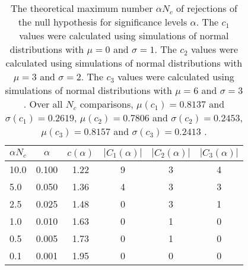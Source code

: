 \begin{table}[h!]
\begin{center}
\begin{tabular}{| l | c | c | c | c | c |}\hline
$\alpha N_c$ & $\alpha$ & $c(\alpha)$ & $|C_1(\alpha)|$ & $|C_2(\alpha)|$ & $|C_3(\alpha)|$ \\\hline
10.0 & 0.100 & 1.22 & 9 & 3 & 4 \\\hline
5.0 & 0.050 & 1.36 & 4 & 3 & 3 \\\hline
2.5 & 0.025 & 1.48 & 0 & 3 & 1 \\\hline
1.0 & 0.010 & 1.63 & 0 & 1 & 0 \\\hline
0.5 & 0.005 & 1.73 & 0 & 1 & 0 \\\hline
0.1 & 0.001 & 1.95 & 0 & 0 & 0 \\\hline
\end{tabular}
\caption{The theoretical maximum number $\alpha N_c$ of rejections
of the null hypothesis for significance levels $\alpha$.
The $c_1$ values were calculated using simulations of normal distributions with $\mu=0$ and $\sigma=1$.
The $c_2$ values were calculated using simulations of normal distributions with $\mu=3$ and $\sigma=2$.
The $c_3$ values were calculated using simulations of normal distributions with $\mu=6$ and $\sigma=3$.
Over all $N_c$ comparisons,
 $\mu(c_1)=0.8137$ and $\sigma(c_1)=0.2619$,
 $\mu(c_2)=0.7806$ and $\sigma(c_2)=0.2453$,
 $\mu(c_3)=0.8157$ and $\sigma(c_3)=0.2413$ .
}
\end{center}
\end{table}